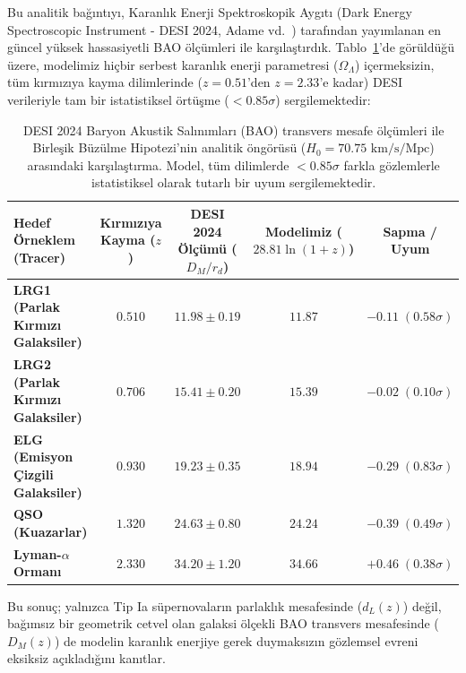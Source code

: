 \documentclass[11pt,a4paper]{article}
\begin{document}
Bu analitik bağıntıyı, Karanlık Enerji Spektroskopik Aygıtı (Dark Energy Spectroscopic Instrument - DESI 2024, Adame vd.~\cite{desi2024}) tarafından yayımlanan en güncel yüksek hassasiyetli BAO ölçümleri ile karşılaştırdık. Tablo~\ref{tab:desi_karsilastirma}'de görüldüğü üzere, modelimiz hiçbir serbest karanlık enerji parametresi ($\Omega_\Lambda$) içermeksizin, tüm kırmızıya kayma dilimlerinde ($z = 0.51$'den $z = 2.33$'e kadar) DESI verileriyle tam bir istatistiksel örtüşme ($<0.85\sigma$) sergilemektedir:

\begin{table}[h!]
    \centering
    \small
    \begin{tabular*}{\textwidth}{@{\extracolsep{\fill}}lcccc@{}}
        \toprule
        \textbf{Hedef Örneklem (Tracer)} & \textbf{Kırmızıya Kayma ($z$)} & \textbf{DESI 2024 Ölçümü ($D_M / r_d$)} & \textbf{Modelimiz ($28.81 \ln(1+z)$)} & \textbf{Sapma / Uyum} \\ \midrule
        \textbf{LRG1 (Parlak Kırmızı Galaksiler)} & $0.510$ & $11.98 \pm 0.19$ & $\mathbf{11.87}$ & $-0.11 \; (0.58\sigma)$ \\
        \textbf{LRG2 (Parlak Kırmızı Galaksiler)} & $0.706$ & $15.41 \pm 0.20$ & $\mathbf{15.39}$ & $-0.02 \; (0.10\sigma)$ \\
        \textbf{ELG (Emisyon Çizgili Galaksiler)}  & $0.930$ & $19.23 \pm 0.35$ & $\mathbf{18.94}$ & $-0.29 \; (0.83\sigma)$ \\
        \textbf{QSO (Kuazarlar)}                 & $1.320$ & $24.63 \pm 0.80$ & $\mathbf{24.24}$ & $-0.39 \; (0.49\sigma)$ \\
        \textbf{Lyman-$\alpha$ Ormanı}           & $2.330$ & $34.20 \pm 1.20$ & $\mathbf{34.66}$ & $+0.46 \; (0.38\sigma)$ \\ \bottomrule
    \end{tabular*}
    \caption{DESI 2024 Baryon Akustik Salınımları (BAO) transvers mesafe ölçümleri ile Birleşik Büzülme Hipotezi'nin analitik öngörüsü ($H_0 = 70.75\text{ km/s/Mpc}$) arasındaki karşılaştırma. Model, tüm dilimlerde $< 0.85\sigma$ farkla gözlemlerle istatistiksel olarak tutarlı bir uyum sergilemektedir.}
    \label{tab:desi_karsilastirma}
\end{table}

Bu sonuç; yalnızca Tip Ia süpernovaların parlaklık mesafesinde ($d_L(z)$) değil, bağımsız bir geometrik cetvel olan galaksi ölçekli BAO transvers mesafesinde ($D_M(z)$) de modelin karanlık enerjiye gerek duymaksızın gözlemsel evreni eksiksiz açıkladığını kanıtlar.
\end{document}
